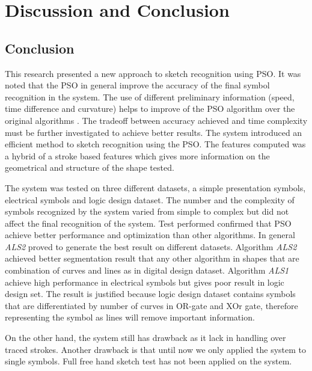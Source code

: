 \chapter{Discussion and Conclusion}
\label{sec:DiscussionConclusion}

\section{Conclusion}
\label{sec:ConclusionConclusion}

This research presented a new approach to sketch recognition using PSO. It was noted that the PSO in general improve the accuracy of the final symbol recognition in the system. The use of different preliminary information (speed, time difference and curvature)  helps to improve of the PSO algorithm over the original algorithms \cite{CruveDivisionSwarm,PolygonApproximationPSO}. The tradeoff between accuracy achieved and time complexity must be further investigated to achieve better results.  The system introduced an efficient method to sketch recognition using the PSO. The features computed was a hybrid of a stroke based features which gives more information on the geometrical and structure of the shape tested.  

The system was tested on three different datasets, a simple presentation symbols, electrical symbols and logic design dataset. The number and the complexity of symbols recognized by the system varied from simple to complex but did not affect the final recognition of the system. Test performed confirmed that PSO achieve better performance and optimization than other algorithms. In general \textsl{ALS2} proved to generate the best result on different datasets. Algorithm \textsl{ALS2} achieved better segmentation result that any other algorithm in shapes that are combination of curves and lines as in digital design dataset. Algorithm \textsl{ALS1} achieve high performance in electrical symbols but gives poor result in logic design set. The result is justified because logic design dataset contains symbols that are differentiated by number of curves in OR-gate and XOr gate, therefore representing the symbol as lines will remove important information. 


 On the other hand, the system still has drawback as it lack in handling over traced strokes.  Another drawback is that until now we only applied the system to single symbols.  Full free hand sketch test has not been applied on the system. %

